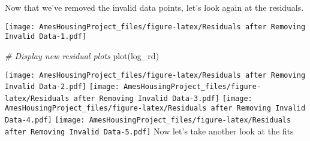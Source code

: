 \documentclass[
]{article}
\newenvironment{Shaded}{\begin{snugshade}}{\end{snugshade}}
\newcommand{\AttributeTok}[1]{\textcolor[rgb]{0.77,0.63,0.00}{#1}}
\newcommand{\CommentTok}[1]{\textcolor[rgb]{0.56,0.35,0.01}{\textit{#1}}}
\newcommand{\ConstantTok}[1]{\textcolor[rgb]{0.00,0.00,0.00}{#1}}
\newcommand{\DecValTok}[1]{\textcolor[rgb]{0.00,0.00,0.81}{#1}}
\newcommand{\FunctionTok}[1]{\textcolor[rgb]{0.00,0.00,0.00}{#1}}
\newcommand{\NormalTok}[1]{#1}
\newcommand{\OtherTok}[1]{\textcolor[rgb]{0.56,0.35,0.01}{#1}}
\newcommand{\SpecialCharTok}[1]{\textcolor[rgb]{0.00,0.00,0.00}{#1}}
\newcommand{\StringTok}[1]{\textcolor[rgb]{0.31,0.60,0.02}{#1}}
\begin{document}
Now that we've removed the invalid data points, let's look again at the
residuals.

\begin{Shaded}
\end{Shaded}

\texttt{[image: AmesHousingProject\_files/figure-latex/Residuals after Removing Invalid Data-1.pdf]}

\begin{Shaded}
\begin{Highlighting}[]
\CommentTok{\# Display new residual plots}
\FunctionTok{plot}\NormalTok{(log\_rd)}
\end{Highlighting}
\end{Shaded}

\texttt{[image: AmesHousingProject\_files/figure-latex/Residuals after Removing Invalid Data-2.pdf]}
\texttt{[image: AmesHousingProject\_files/figure-latex/Residuals after Removing Invalid Data-3.pdf]}
\texttt{[image: AmesHousingProject\_files/figure-latex/Residuals after Removing Invalid Data-4.pdf]}
\texttt{[image: AmesHousingProject\_files/figure-latex/Residuals after Removing Invalid Data-5.pdf]}
Now let's take another look at the fits
\end{document}
